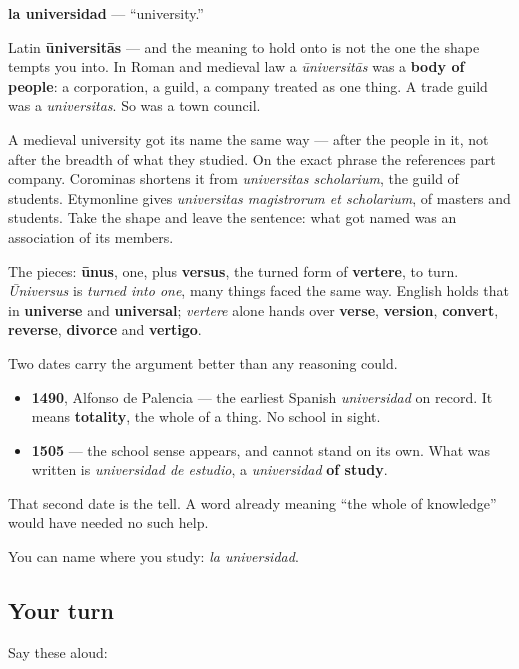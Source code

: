 \begin{cousinweb}
\textbf{la universidad} — \textquotedblleft{}university.\textquotedblright{}

Latin \textbf{ūniversitās} — and the meaning to hold onto is not the one the shape tempts you into. In Roman and medieval law a \emph{ūniversitās} was a \textbf{body of people}: a corporation, a guild, a company treated as one thing. A trade guild was a \emph{universitas}. So was a town council.

A medieval university got its name the same way — after the people in it, not after the breadth of what they studied. On the exact phrase the references part company. Corominas shortens it from \emph{universitas scholarium}, the guild of students. Etymonline gives \emph{universitas magistrorum et scholarium}, of masters and students. Take the shape and leave the sentence: what got named was an association of its members.

The pieces: \textbf{ūnus}, one, plus \textbf{versus}, the turned form of \textbf{vertere}, to turn. \emph{Ūniversus} is \emph{turned into one}, many things faced the same way. English holds that in \textbf{universe} and \textbf{universal}; \emph{vertere} alone hands over \textbf{verse}, \textbf{version}, \textbf{convert}, \textbf{reverse}, \textbf{divorce} and \textbf{vertigo}.

Two dates carry the argument better than any reasoning could.

\begin{itemize}
\raggedright
  \item \textbf{1490}, Alfonso de Palencia — the earliest Spanish \emph{universidad} on record. It means \textbf{totality}, the whole of a thing. No school in sight.
  \item \textbf{1505} — the school sense appears, and cannot stand on its own. What was written is \emph{universidad de estudio}, a \emph{universidad} \textbf{of study}.
\end{itemize}

That second date is the tell. A word already meaning \textquotedblleft{}the whole of knowledge\textquotedblright{} would have needed no such help.
\end{cousinweb}

\begin{grammarlens}[title={What you've built}]
You can name where you study: \emph{la universidad}.
\end{grammarlens}

\subsection*{Your turn}
Say these aloud:

